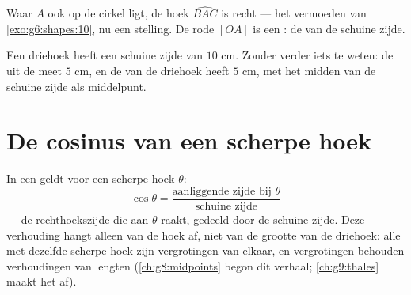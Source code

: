 \begin{omfigure}

{\small Waar $A$ ook op de cirkel ligt, de hoek $\widehat{BAC}$ is recht --- het
vermoeden van \cref{exo:g6:shapes:10}, nu een stelling. De rode 
$[OA]$ is een : de  van de schuine zijde.}
\end{omfigure}

\begin{example}\label{ex:g8:cosine:circle}
Een driehoek heeft een schuine zijde van $10$ cm. Zonder verder iets te weten:
de  uit de  meet $5$ cm, en de  van de
driehoek heeft  $5$ cm, met het midden van de schuine zijde als middelpunt.
\end{example}

\section{De cosinus van een scherpe hoek}

\begin{definition}[Cosinus]\label{def:g8:cosine:def}
In een  geldt voor een scherpe hoek $\theta$:
\[
\cos\theta = \frac{\text{aanliggende zijde bij } \theta}{\text{schuine zijde}}
\]
--- de rechthoekszijde die aan $\theta$ raakt, gedeeld door de schuine zijde.
Deze verhouding hangt alleen van de hoek af, niet van de grootte van de driehoek:
alle  met dezelfde scherpe hoek zijn vergrotingen van
elkaar, en vergrotingen behouden verhoudingen van lengten
(\cref{ch:g8:midpoints} begon dit verhaal; \cref{ch:g9:thales} maakt het af).
\end{definition}

